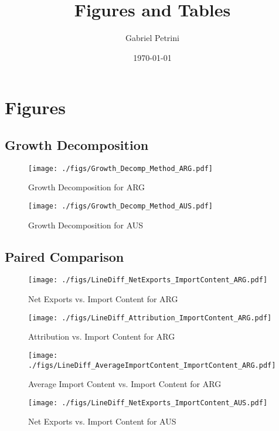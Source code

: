 \documentclass[11pt]{article}
\author{Gabriel Petrini}
\date{\today}
\title{Figures and Tables}
\begin{document}
\maketitle
\tableofcontents

\section{Figures}
\label{sec:org38951e0}

\subsection{Growth Decomposition}
\label{sec:org3bf0508}

\begin{figure}[t]
\centering
\texttt{[image: ./figs/Growth\_Decomp\_Method\_ARG.pdf]}
\caption{Growth Decomposition for ARG}
\end{figure}

\begin{figure}[t]
\centering
\texttt{[image: ./figs/Growth\_Decomp\_Method\_AUS.pdf]}
\caption{Growth Decomposition for AUS}
\end{figure}
\subsection{Paired Comparison}
\label{sec:org02fe547}


\begin{figure}[H]
\centering
\texttt{[image: ./figs/LineDiff\_NetExports\_ImportContent\_ARG.pdf]}
\caption{Net Exports vs. Import Content for ARG}
\end{figure}

\begin{figure}[H]
\centering
\texttt{[image: ./figs/LineDiff\_Attribution\_ImportContent\_ARG.pdf]}
\caption{Attribution vs. Import Content for ARG}
\end{figure}

\begin{figure}[H]
\centering
\texttt{[image: ./figs/LineDiff\_AverageImportContent\_ImportContent\_ARG.pdf]}
\caption{Average Import Content vs. Import Content for ARG}
\end{figure}

\begin{figure}[H]
\centering
\texttt{[image: ./figs/LineDiff\_NetExports\_ImportContent\_AUS.pdf]}
\caption{Net Exports vs. Import Content for AUS}
\end{figure}
\end{document}
